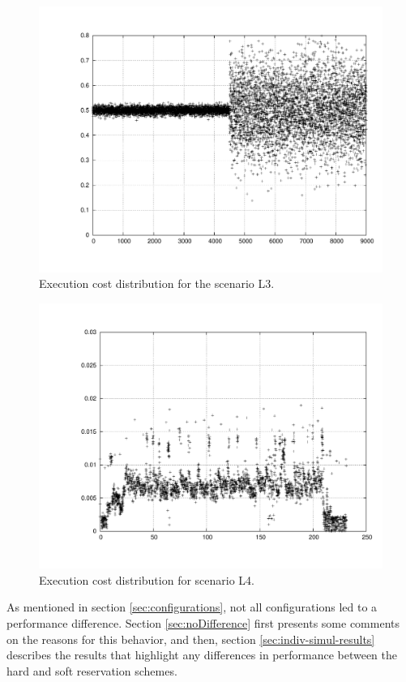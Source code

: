 \documentclass[times, 10pt,twocolumn]{article}
\begin{document}
\begin{figure}[h!t]
  \centering
  \includegraphics[scale=0.31]{trace-variance}
  \caption{Execution cost distribution for the scenario L3.}
  \label{fig:plotl3}
\end{figure}

\begin{figure}[h!t]
  \centering
  \includegraphics[scale=0.31]{trace-eve}
  \caption{Execution cost distribution for scenario L4.}
  \label{fig:plotl4}
\end{figure}

\label{sec:simulation-results}

As mentioned in section \ref{sec:configurations}, not all
configurations led to a performance difference. Section
\ref{sec:noDifference} first presents some comments on the reasons for
this behavior, and then, section \ref{sec:indiv-simul-results}
describes the results that highlight any differences in performance
between the hard and soft reservation schemes.
\end{document}
